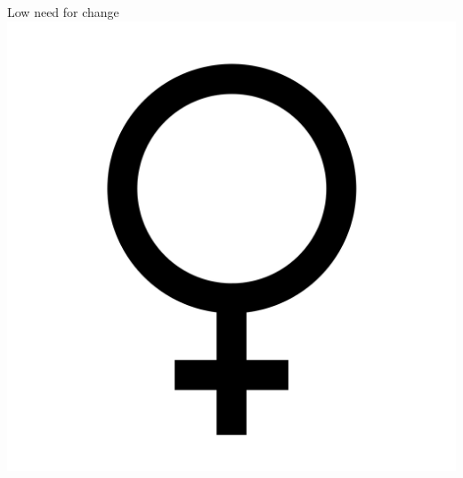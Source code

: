 \documentclass[aspectratio=169]{beamer}
\begin{document}
\begin{frame}
  \begin{center}
    \Huge Low need for change \\
    \includegraphics[scale=.025]{./assets/women.png} \\
    \small \cite{langford93}
  \end{center}
\end{frame}
\end{document}
